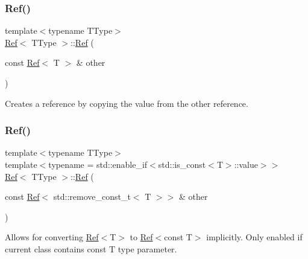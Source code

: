 \mbox{\label{class_ref_af5a5311e5afb91b98e20c5d96c3ae31b}} 
\subsubsection{\texorpdfstring{Ref()}{Ref()}\hspace{0.1cm}{\footnotesize\ttfamily [4/6]}}
{\footnotesize\ttfamily template$<$typename T\+Type$>$ \\
\mbox{\hyperlink{class_ref}{Ref}}$<$ T\+Type $>$\+::\mbox{\hyperlink{class_ref}{Ref}} (\begin{DoxyParamCaption}\item[{const \mbox{\hyperlink{class_ref}{Ref}}$<$ T $>$ \&}]{other }\end{DoxyParamCaption})\hspace{0.3cm}{\ttfamily [inline]}}



Creates a reference by copying the value from the other reference. 

\mbox{\label{class_ref_a0ff7c9e8c09bd700086040b8b6f89a35}} 
\subsubsection{\texorpdfstring{Ref()}{Ref()}\hspace{0.1cm}{\footnotesize\ttfamily [5/6]}}
{\footnotesize\ttfamily template$<$typename T\+Type$>$ \\
template$<$typename  = std\+::enable\+\_\+if$<$std\+::is\+\_\+const$<$\+T$>$\+::value$>$$>$ \\
\mbox{\hyperlink{class_ref}{Ref}}$<$ T\+Type $>$\+::\mbox{\hyperlink{class_ref}{Ref}} (\begin{DoxyParamCaption}\item[{const \mbox{\hyperlink{class_ref}{Ref}}$<$ std\+::remove\+\_\+const\+\_\+t$<$ T $>$$>$ \&}]{other }\end{DoxyParamCaption})\hspace{0.3cm}{\ttfamily [inline]}}



Allows for converting \mbox{\hyperlink{class_ref}{Ref}}$<$T$>$ to \mbox{\hyperlink{class_ref}{Ref}}$<$const T$>$ implicitly. Only enabled if current class contains const T type parameter. 

